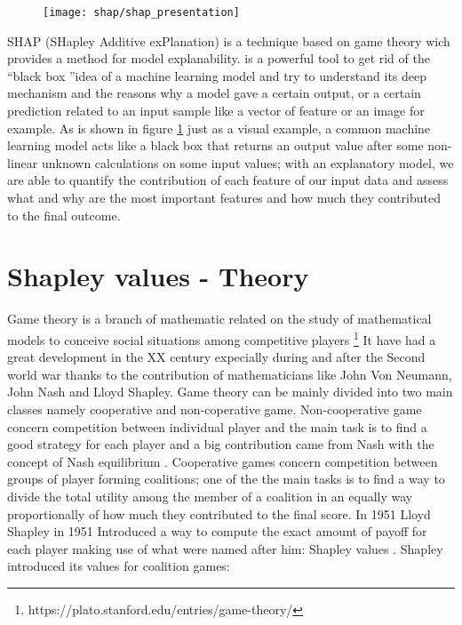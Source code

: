 \documentclass[11pt]{report}
\begin{document}
\begin{figure}[h]
\centering
\texttt{[image: shap/shap\_presentation]}
\caption{}\label{fig:shap_waterfall}
\end{figure}


SHAP (SHapley Additive exPlanation) is a technique based on game theory wich provides a method for model explanability.
is a powerful tool to get rid of the \textquotedblleft black box \textquotedblright idea of a machine learning model and try to understand its deep mechanism and the reasons why a model gave a certain output, or a certain prediction related to an input sample like a vector of feature or an image for example.
As is shown in figure \ref{fig:shap_waterfall} just as a visual example, a common machine learning model acts like a black box that returns an output value after some non-linear unknown calculations on some input values; with an explanatory model, we are able to quantify the contribution of each feature of our input data and assess what and why are the most important features and how much they contributed to the final outcome.




\section{Shapley values - Theory}

Game theory is a branch of mathematic related on the study of mathematical models to  conceive social situations among competitive players \footnote{https://plato.stanford.edu/entries/game-theory/}
It have had a great development in the XX century expecially during and after the Second world war thanks to the contribution of mathematicians like John Von Neumann, John Nash and Lloyd Shapley.
Game theory can be mainly divided into two main classes namely cooperative and non-coperative game.
Non-cooperative game concern competition between individual player and the main task is to find a good strategy for each player and a big contribution came from Nash with the concept of Nash equilibrium \cite{nash-1950}.
Cooperative games concern competition between groups of player forming coalitions; one of the the main tasks is to find a way to divide the total utility among the member of a coalition in an equally way proportionally of how much they contributed to the final score.
In 1951 Lloyd Shapley in 1951 Introduced a way to compute the exact amount of payoff for each player making use of what were named after him: Shapley values \cite{shap-1951}\cite{shap-1953}.
Shapley introduced its values for coalition games:
\end{document}
